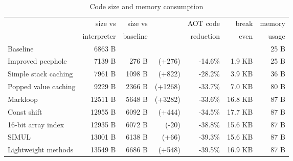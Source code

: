 \begin{table}
\centering
\caption{Code size and memory consumption}
\label{tbl-code-size-and-memory-consumption}
    \begin{tabular}{lrrrrrr} %
    \toprule
                              & size vs     & size vs  &                      & AOT code  &   break & memory    \\
                              & interpreter & baseline &                      & reduction &   even  & usage     \\
    \midrule
    \midrule
    Baseline                  &     6863 B  &          &                      &           &         & 25 B      \\
    Improved peephole         &     7139 B  &   276 B  & \scriptsize   (+276) &  -14.6\%  &  1.9 KB & 25 B      \\
    Simple stack caching      &     7961 B  &  1098 B  & \scriptsize   (+822) &  -28.2\%  &  3.9 KB & 36 B      \\
    Popped value caching      &     9229 B  &  2366 B  & \scriptsize  (+1268) &  -33.7\%  &  7.0 KB & 80 B      \\
    Markloop                  &    12511 B  &  5648 B  & \scriptsize  (+3282) &  -33.6\%  & 16.8 KB & 87 B      \\
    Const shift               &    12955 B  &  6092 B  & \scriptsize   (+444) &  -34.5\%  & 17.7 KB & 87 B      \\
    16-bit array index        &    12935 B  &  6072 B  & \scriptsize    (-20) &  -38.8\%  & 15.6 KB & 87 B      \\
    SIMUL                     &    13001 B  &  6138 B  & \scriptsize    (+66) &  -39.3\%  & 15.6 KB & 87 B      \\
    Lightweight methods       &    13549 B  &  6686 B  & \scriptsize   (+548) &  -39.5\%  & 16.9 KB & 87 B      \\
    \bottomrule
    \end{tabular}
\end{table}
